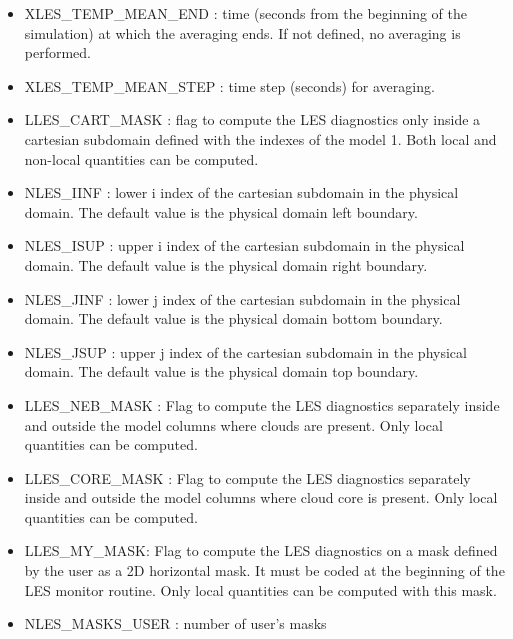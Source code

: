 \begin{itemize}
\item
XLES\_TEMP\_MEAN\_END  : time (seconds from the beginning of the simulation)
at which the averaging ends. If not defined, no averaging is performed.

\item
XLES\_TEMP\_MEAN\_STEP  : time step (seconds) for averaging.                     

\item
LLES\_CART\_MASK   : flag to compute the LES diagnostics
only inside a cartesian subdomain defined with the indexes of the model 1. Both local and non-local
quantities can be computed.

\item
NLES\_IINF  : lower i index of the cartesian subdomain in the physical domain. The default value is the
physical domain left boundary.

\item
NLES\_ISUP  : upper i index of the cartesian subdomain in the physical domain. The default value is the
physical domain right  boundary.

\item
NLES\_JINF  : lower j index of the cartesian subdomain in the physical domain. The default value is the
physical domain bottom boundary.

\item
NLES\_JSUP : upper j index of the cartesian subdomain in the physical domain. The default value is the
physical domain top boundary.

\item
LLES\_NEB\_MASK  : Flag to compute the LES diagnostics
separately inside and outside  the model columns where clouds
are present. Only local
quantities can be computed.

\item
LLES\_CORE\_MASK  : Flag to compute the LES diagnostics
separately inside and outside  the model columns where cloud core is present.
Only local quantities can be computed.

\item
LLES\_MY\_MASK: Flag to compute the LES diagnostics
on a mask defined by the user as a 2D horizontal mask.
It must be coded at the
beginning of the LES monitor routine. Only local quantities can be computed
with this mask.
\item
NLES\_MASKS\_USER  : number of user's masks

\end{itemize}


